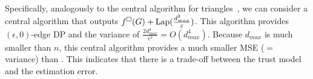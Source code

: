 Specifically, 
analogously to the central algorithm for triangles~\cite{Imola_USENIX21}, 
we can consider a central algorithm that outputs $f^\square(G) + \textrm{Lap}(\frac{d_{max}^2}{\varepsilon})$. 
This algorithm provides 
$(\epsilon, 0)$-edge DP and the variance of $\frac{2d_{max}^4}{\epsilon^2} = O(d_{max}^4)$. 
Because $d_{max}$ is much smaller than $n$, this central algorithm provides a much smaller MSE ($=$ variance) than \AlgWSCyc{}. 
This indicates 
that there is a trade-off between the trust model and the estimation error. 


